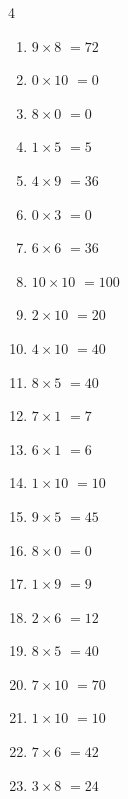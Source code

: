 \begin{multicols}{4}
\begin{enumerate}
  \item $9\times 8$
        $=72$

  \item $0\times 10$
        $=0$

  \item $8\times 0$
        $=0$

  \item $1\times 5$
        $=5$

  \item $4\times 9$
        $=36$

  \item $0\times 3$
        $=0$

  \item $6\times 6$
        $=36$

  \item $10\times 10$
        $=100$

  \item $2\times 10$
        $=20$

  \item $4\times 10$
        $=40$

  \item $8\times 5$
        $=40$

  \item $7\times 1$
        $=7$

  \item $6\times 1$
        $=6$

  \item $1\times 10$
        $=10$

  \item $9\times 5$
        $=45$

  \item $8\times 0$
        $=0$

  \item $1\times 9$
        $=9$

  \item $2\times 6$
        $=12$

  \item $8\times 5$
        $=40$

\columnbreak %

  \item $7\times 10$
        $=70$

  \item $1\times 10$
        $=10$

  \item $7\times 6$
        $=42$

  \item $3\times 8$
        $=24$


\end{enumerate}
\end{multicols}
